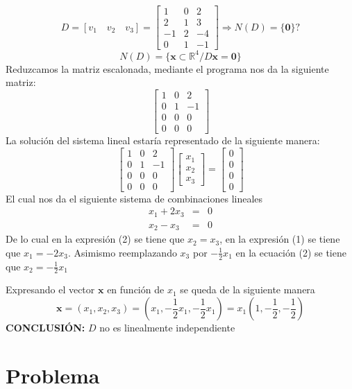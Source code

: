 \[
D = [ {v}_{1} \quad {v}_{2} \quad {v}_{3} ] =
\begin{bmatrix}
1 & 0 & 2 \\ 
2 & 1 & 3 \\
-1 & 2 & -4 \\
0 & 1 & -1
\end{bmatrix}
\Longrightarrow N(D) = \{ \mathbf{0} \} ?
\]
$$
N(D) = \{ \mathbf{x} \subset \mathbb{R}^4 / D \mathbf{x} = \mathbf{0} \}
$$
Reduzcamos la matriz escalonada, mediante el programa nos da la siguiente matriz:
$$
\begin{bmatrix}
1 & 0 & 2 \\ 
0 & 1 & -1 \\
0 & 0 & 0 \\
0 & 0 & 0
\end{bmatrix}
$$
La solución del sistema lineal estaría representado de la siguiente manera:
\[
\begin{bmatrix}
1 & 0 & 2 \\ 
0 & 1 & -1 \\
0 & 0 & 0 \\
0 & 0 & 0
\end{bmatrix}
\begin{bmatrix}
{x}_{1} \\ 
{x}_{2} \\
{x}_{3}
\end{bmatrix} =
\begin{bmatrix}
0 \\ 
0 \\
0 \\
0
\end{bmatrix}
\]
El cual nos da el siguiente sistema de combinaciones lineales
\setcounter{equation}{0}
\begin{eqnarray}
    {x}_{1} + 2{x}_{3} &=& 0 \\
    {x}_{2} - {x}_{3} &=& 0
\end{eqnarray}
De lo cual en la expresión (2) se tiene que ${x}_{2} = {x}_{3}$, en la expresión (1) se tiene que ${x}_{1} = -2 {x}_{3}$. Asimismo reemplazando ${x}_{3}$ por $-\frac{1}{2}{x}_{1}$ en la ecuación (2) se tiene que ${x}_{2} = -\frac{1}{2}{x}_{1}$

Expresando el vector $\mathbf{x}$ en función de ${x}_{1}$ se queda de la siguiente manera
$$
\mathbf{x} = ({x}_{1}, {x}_{2}, {x}_{3}) = \left( {x}_{1}, -\frac{1}{2}{x}_{1}, -\frac{1}{2}{x}_{1} \right) = {x}_{1} \left(1, -\frac{1}{2}, -\frac{1}{2} \right)
$$
\textbf{CONCLUSIÓN:} $D$ no es linealmente independiente

\section{Problema}

